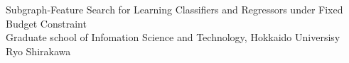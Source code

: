 \documentclass[a4j,11pt]{article}
\begin{document}
\begin{titlepage}
 \setcounter{page}{0}
  \begin{center}
   \vspace*{2.0cm}
   \LARGE
   Subgraph-Feature Search for Learning Classifiers and Regressors under Fixed Budget Constraint
   \\
   \vfill
   \LARGE
   Graduate school of Infomation Science and Technology, Hokkaido Universisy\\
   \vspace{2ex}
   Ryo Shirakawa\\
   \vspace{2ex}
   \vspace*{2cm}
  \end{center}
\end{titlepage}
\tableofcontents \thispagestyle{empty}
 \newpage
 \listoffigures

 \listoftables
 \clearpage 
 \pagestyle{plain} 


\begin{abstract}

\end{abstract}









\newpage

 
\newpage
\small
%



\small
\appendix

\end{document}
